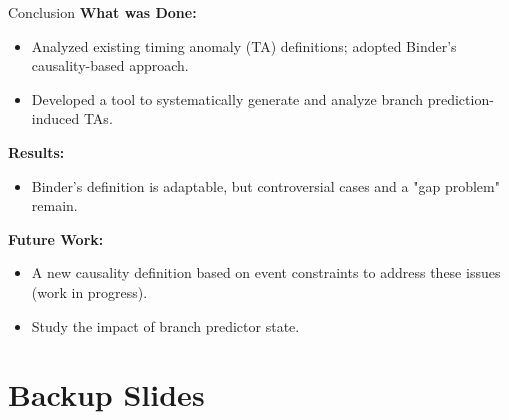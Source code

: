 \documentclass{beamer}
\begin{document}
\begin{frame}{Conclusion}
    \textbf{What was Done:}
    \begin{itemize}
        \item Analyzed existing timing anomaly (TA) definitions; adopted Binder's causality-based approach.
        \item Developed a tool to systematically generate and analyze branch prediction-induced TAs.
    \end{itemize}

    \textbf{Results:}
    \begin{itemize}
        \item Binder's definition is adaptable, but controversial cases and a "gap problem" remain.
    \end{itemize}

    \textbf{Future Work:}
    \begin{itemize}
        \item A new causality definition based on event constraints to address these issues (work in progress).
        \item Study the impact of branch predictor state.
    \end{itemize}


\end{frame}

\appendix

\section{Backup Slides}
\end{document}
